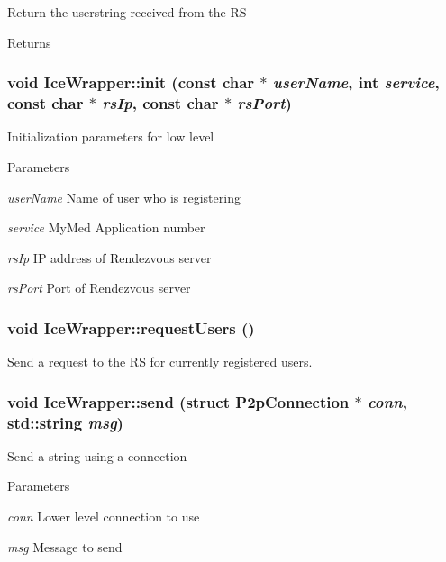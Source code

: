 \label{classIceWrapper_a7c19df1031dcd86d2133c5a179bb7ece}
Return the userstring received from the RS \begin{DoxyReturn}{Returns}

\end{DoxyReturn}
\hypertarget{classIceWrapper_a9e34cb1f8e4a8b0361cb926c57971cab}{
\subsubsection[{init}]{\setlength{\rightskip}{0pt plus 5cm}void IceWrapper::init (const char $\ast$ {\em userName}, \/  int {\em service}, \/  const char $\ast$ {\em rsIp}, \/  const char $\ast$ {\em rsPort})}}
\label{classIceWrapper_a9e34cb1f8e4a8b0361cb926c57971cab}
Initialization parameters for low level 
\begin{DoxyParams}{Parameters}
\item[{\em userName}]Name of user who is registering \item[{\em service}]MyMed Application number \item[{\em rsIp}]IP address of Rendezvous server \item[{\em rsPort}]Port of Rendezvous server \end{DoxyParams}
\hypertarget{classIceWrapper_a1e68094e92efc427f584c682c8a470fb}{
\subsubsection[{requestUsers}]{\setlength{\rightskip}{0pt plus 5cm}void IceWrapper::requestUsers ()}}
\label{classIceWrapper_a1e68094e92efc427f584c682c8a470fb}
Send a request to the RS for currently registered users. \hypertarget{classIceWrapper_a35ad9141a6f4a9f57f842c9f807f99bc}{
\subsubsection[{send}]{\setlength{\rightskip}{0pt plus 5cm}void IceWrapper::send (struct {\bf P2pConnection} $\ast$ {\em conn}, \/  std::string {\em msg})}}
\label{classIceWrapper_a35ad9141a6f4a9f57f842c9f807f99bc}
Send a string using a connection 
\begin{DoxyParams}{Parameters}
\item[{\em conn}]Lower level connection to use \item[{\em msg}]Message to send \end{DoxyParams}
